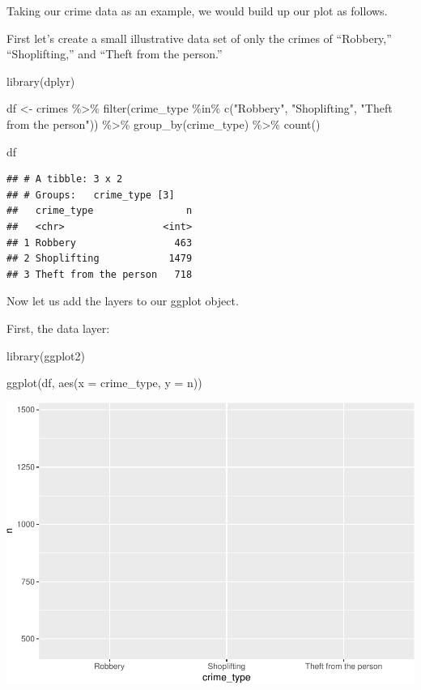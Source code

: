 \documentclass[
]{book}
\makeatletter
\newenvironment{Shaded}{\begin{snugshade}}{\end{snugshade}}
\newcommand{\AttributeTok}[1]{\textcolor[rgb]{0.61,0.61,0.61}{#1}}
\newcommand{\FunctionTok}[1]{\textcolor[rgb]{0,0,0}{#1}}
\newcommand{\NormalTok}[1]{#1}
\newcommand{\OtherTok}[1]{\textcolor[rgb]{0.37,0.37,0.37}{#1}}
\newcommand{\SpecialCharTok}[1]{\textcolor[rgb]{0,0,0}{#1}}
\newcommand{\StringTok}[1]{\textcolor[rgb]{0.5,0.5,0.5}{#1}}
\newenvironment{kframe}{%
\medskip{}
\setlength{\fboxsep}{.8em}
 \def\at@end@of@kframe{}%
 \ifinner\ifhmode%
  \def\at@end@of@kframe{\end{minipage}}%
  \begin{minipage}{\columnwidth}%
 \fi\fi%
 \def\FrameCommand##1{\hskip\@totalleftmargin \hskip-\fboxsep
 \colorbox{shadecolor}{##1}\hskip-\fboxsep
     \hskip-\linewidth \hskip-\@totalleftmargin \hskip\columnwidth}%
 \MakeFramed {\advance\hsize-\width
   \@totalleftmargin\z@ \linewidth\hsize
   \@setminipage}}%
 {\par\unskip\endMakeFramed%
 \at@end@of@kframe}
\renewenvironment{Shaded}{\begin{kframe}}{\end{kframe}}
\makeatother
\begin{document}
Taking our crime data as an example, we would build up our plot as follows.

First let's create a small illustrative data set of only the crimes of ``Robbery,'' ``Shoplifting,'' and ``Theft from the person.''

\begin{Shaded}
\begin{Highlighting}[]
\FunctionTok{library}\NormalTok{(dplyr)}

\NormalTok{df }\OtherTok{\textless{}{-}}\NormalTok{ crimes }\SpecialCharTok{\%\textgreater{}\%} 
  \FunctionTok{filter}\NormalTok{(crime\_type }\SpecialCharTok{\%in\%} \FunctionTok{c}\NormalTok{(}\StringTok{"Robbery"}\NormalTok{, }
                           \StringTok{"Shoplifting"}\NormalTok{, }
                           \StringTok{"Theft from the person"}\NormalTok{)) }\SpecialCharTok{\%\textgreater{}\%} 
  \FunctionTok{group\_by}\NormalTok{(crime\_type) }\SpecialCharTok{\%\textgreater{}\%} 
  \FunctionTok{count}\NormalTok{() }
  
\NormalTok{df}
\end{Highlighting}
\end{Shaded}

\begin{verbatim}
## # A tibble: 3 x 2
## # Groups:   crime_type [3]
##   crime_type                n
##   <chr>                 <int>
## 1 Robbery                 463
## 2 Shoplifting            1479
## 3 Theft from the person   718
\end{verbatim}

Now let us add the layers to our ggplot object.

First, the data layer:

\begin{Shaded}
\begin{Highlighting}[]
\FunctionTok{library}\NormalTok{(ggplot2)}

\FunctionTok{ggplot}\NormalTok{(df, }\FunctionTok{aes}\NormalTok{(}\AttributeTok{x =}\NormalTok{ crime\_type, }\AttributeTok{y =}\NormalTok{ n))}
\end{Highlighting}
\end{Shaded}

\includegraphics{crime_mapping_files/figure-latex/unnamed-chunk-8-1.pdf}
\end{document}
